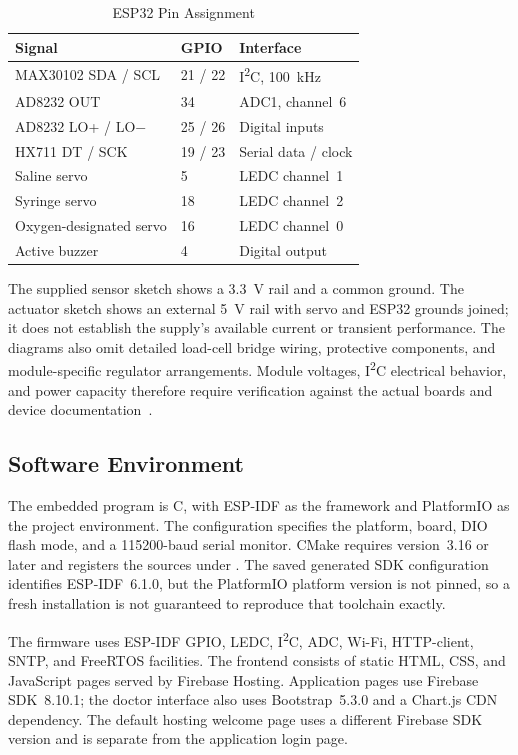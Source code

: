 \begin{table}[!t]
\caption{ESP32 Pin Assignment}\label{tab:pins}
\centering\footnotesize
\begin{tabularx}{\columnwidth}{@{}YP{0.18\columnwidth}P{0.30\columnwidth}@{}}
\toprule
Signal & GPIO & Interface \\
\midrule
MAX30102 SDA / SCL & 21 / 22 & I\textsuperscript{2}C, 100~kHz \\
AD8232 OUT & 34 & ADC1, channel~6 \\
AD8232 LO+ / LO$-$ & 25 / 26 & Digital inputs \\
HX711 DT / SCK & 19 / 23 & Serial data / clock \\
Saline servo & 5 & LEDC channel~1 \\
Syringe servo & 18 & LEDC channel~2 \\
Oxygen-designated servo & 16 & LEDC channel~0 \\
Active buzzer & 4 & Digital output \\
\bottomrule
\end{tabularx}
\end{table}

The supplied sensor sketch shows a 3.3~V rail and a common ground. The actuator sketch shows an external 5~V rail with servo and ESP32 grounds joined; it does not establish the supply's available current or transient performance. The diagrams also omit detailed load-cell bridge wiring, protective components, and module-specific regulator arrangements. Module voltages, I\textsuperscript{2}C electrical behavior, and power capacity therefore require verification against the actual boards and device documentation~\cite{max30102,ad8232,i2cmanual}.

\subsection{Software Environment}
The embedded program is C, with ESP-IDF as the framework and PlatformIO as the project environment. The configuration specifies the  platform,  board, DIO flash mode, and a 115200-baud serial monitor. CMake requires version~3.16 or later and registers the sources under . The saved generated SDK configuration identifies ESP-IDF~6.1.0, but the PlatformIO platform version is not pinned, so a fresh installation is not guaranteed to reproduce that toolchain exactly.

The firmware uses ESP-IDF GPIO, LEDC, I\textsuperscript{2}C, ADC, Wi-Fi, HTTP-client, SNTP, and FreeRTOS facilities. The frontend consists of static HTML, CSS, and JavaScript pages served by Firebase Hosting. Application pages use Firebase SDK~8.10.1; the doctor interface also uses Bootstrap~5.3.0 and a Chart.js CDN dependency. The default hosting welcome page uses a different Firebase SDK version and is separate from the application login page.


